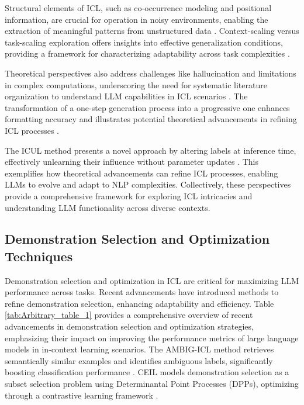 Structural elements of ICL, such as co-occurrence modeling and positional information, are crucial for operation in noisy environments, enabling the extraction of meaningful patterns from unstructured data \cite{wibisono2024unstructureddataincontextlearning}. Context-scaling versus task-scaling exploration offers insights into effective generalization conditions, providing a framework for characterizing adaptability across task complexities \cite{abedsoltan2024contextscalingversustaskscalingincontext}.

Theoretical perspectives also address challenges like hallucination and limitations in complex computations, underscoring the need for systematic literature organization to understand LLM capabilities in ICL scenarios \cite{qu2024toollearninglargelanguage}. The transformation of a one-step generation process into a progressive one enhances formatting accuracy and illustrates potential theoretical advancements in refining ICL processes \cite{nie2024codestyleincontextlearningknowledgebased}.

The ICUL method presents a novel approach by altering labels at inference time, effectively unlearning their influence without parameter updates \cite{pawelczyk2023context}. This exemplifies how theoretical advancements can refine ICL processes, enabling LLMs to evolve and adapt to NLP complexities. Collectively, these perspectives provide a comprehensive framework for exploring ICL intricacies and understanding LLM functionality across diverse contexts.


\subsection{Demonstration Selection and Optimization Techniques} \label{subsec:Demonstration Selection and Optimization Techniques}



Demonstration selection and optimization in ICL are critical for maximizing LLM performance across tasks. Recent advancements have introduced methods to refine demonstration selection, enhancing adaptability and efficiency. Table \ref{tab:Arbitrary_table_1} provides a comprehensive overview of recent advancements in demonstration selection and optimization strategies, emphasizing their impact on improving the performance metrics of large language models in in-context learning scenarios. The AMBIG-ICL method retrieves semantically similar examples and identifies ambiguous labels, significantly boosting classification performance \cite{gao2023ambiguity}. CEIL models demonstration selection as a subset selection problem using Determinantal Point Processes (DPPs), optimizing through a contrastive learning framework \cite{ye2023compositionalexemplarsincontextlearning}.

